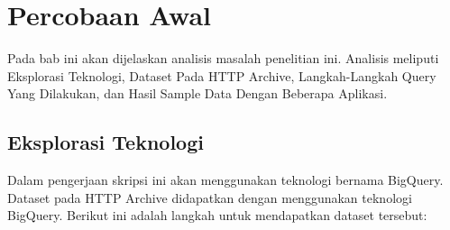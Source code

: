 \chapter{Percobaan Awal}
\label{chap:percobaan_awal}
Pada bab ini akan dijelaskan analisis masalah penelitian ini. Analisis meliputi Eksplorasi Teknologi, Dataset Pada HTTP Archive, Langkah-Langkah Query Yang Dilakukan, dan Hasil Sample Data Dengan Beberapa Aplikasi.

\section{Eksplorasi Teknologi}
Dalam pengerjaan skripsi ini akan menggunakan teknologi bernama BigQuery. Dataset pada HTTP Archive didapatkan dengan menggunakan teknologi BigQuery.
Berikut ini adalah langkah untuk mendapatkan dataset tersebut:
